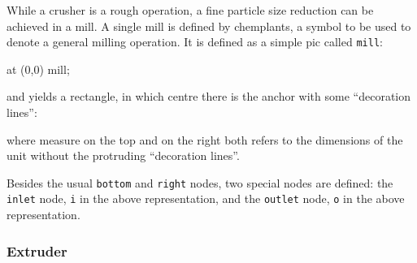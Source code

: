 \documentclass[12pt]{article}						%
\newcommand*{\chpn}[1]{\texttt{#1}}				%
\newcommand*{\chpp}[1]{\texttt{#1}}				%
\newcommand*{\chemplants}{chemplants}
\begin{document}
While a crusher is a rough operation, a fine particle size reduction can be
achieved in a mill. A single mill is defined by \chemplants, a symbol to be used
to denote a general milling operation. It is defined as a simple pic called
\chpp{mill}:
\begin{chpcode}
	\pic at (0,0) {mill};
\end{chpcode}
and yields a rectangle, in which centre there is the anchor with some
``decoration lines'':
\begin{center}
\end{center}
where measure on the top and on the right both refers to the dimensions of the
unit without the protruding ``decoration lines''.

Besides the usual \chpn{bottom} and \chpn{right} nodes, two special
nodes are defined: the \chpn{inlet} node, \chpn{i} in the above representation,
and the \chpn{outlet} node, \chpn{o} in the above representation.

\subsubsection{Extruder}
\end{document}
